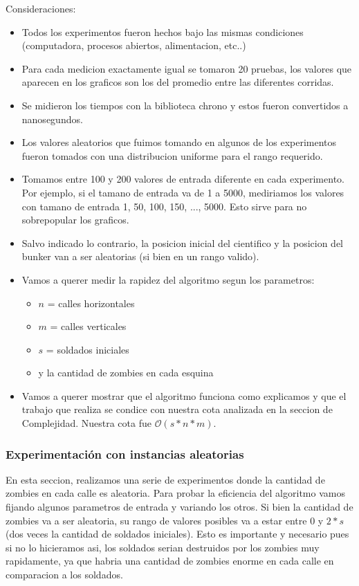 Consideraciones:
\begin{itemize}
  \item Todos los experimentos fueron hechos bajo las mismas condiciones (computadora, procesos abiertos, alimentacion, etc..)
  \item Para cada medicion exactamente igual se tomaron 20 pruebas, los valores que aparecen en los graficos son los del promedio entre las diferentes corridas.
  \item Se midieron los tiempos con la biblioteca chrono y estos fueron convertidos a nanosegundos.
  \item Los valores aleatorios que fuimos tomando en algunos de los experimentos fueron tomados con una distribucion uniforme para el rango requerido.
  \item Tomamos entre 100 y 200 valores de entrada diferente en cada experimento. Por ejemplo, si el tamano de entrada va de 1 a 5000, mediriamos los valores con tamano de entrada 1, 50, 100, 150, ..., 5000. Esto sirve para no sobrepopular los graficos.
  \item Salvo indicado lo contrario, la posicion inicial del cientifico y la posicion del bunker van a ser aleatorias (si bien en un rango valido).
  \item Vamos a querer medir la rapidez del algoritmo segun los parametros:
    \begin{itemize}
      \item $n$ = calles horizontales
      \item $m$ = calles verticales
      \item $s$ = soldados iniciales
      \item y la cantidad de zombies en cada esquina
    \end{itemize}
  \item Vamos a querer mostrar que el algoritmo funciona como explicamos y que el trabajo que realiza se condice con nuestra cota analizada en la seccion de Complejidad. Nuestra cota fue $\mathcal{O}(s*n*m)$.
\end{itemize}

\subsubsection{Experimentación con instancias aleatorias}

En esta seccion, realizamos una serie de experimentos donde la cantidad de zombies en cada calle es aleatoria. Para probar la eficiencia del algoritmo vamos fijando algunos parametros de entrada y variando los otros. Si bien la cantidad de zombies va a ser aleatoria, su rango de valores posibles va a estar entre 0 y $2*s$ (dos veces la cantidad de soldados iniciales). Esto es importante y necesario pues si no lo hicieramos asi, los soldados serian destruidos por los zombies muy rapidamente, ya que habria una cantidad de zombies enorme en cada calle en comparacion a los soldados.

